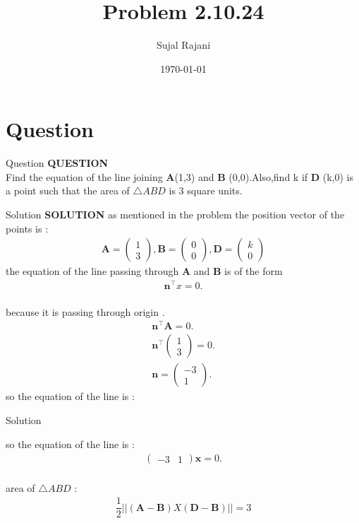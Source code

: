\documentclass{beamer}
\title{Problem 2.10.24}
\author{Sujal Rajani}
\date{\today}
\let\vec\mathbf
\theoremstyle{remark}
\newcommand{\myvec}[1]{\ensuremath{\begin{pmatrix}#1\end{pmatrix}}}
\numberwithin{equation}{section}
\begin{document}
\begin{frame}
\titlepage
\end{frame}

\section{Question}
\begin{frame}{Question}
\textbf{QUESTION}
\\
Find the equation of the line joining $\vec{A}$(1,3) and $\vec{B}$ (0,0).Also,find k if $\vec{D}$ (k,0) is a point such that the area of $\triangle ABD$ is 3 square units.
\end{frame}
\begin{frame}{Solution}
\textbf{SOLUTION}
as mentioned in the problem the position vector of the points is :
\\
\begin{align*}
    \vec{A}=\myvec{1\\3},\vec{B}=\myvec{0\\0},\vec{D}=\myvec{k\\0}
\end{align*}
the equation of the line passing through $\vec{A}$ and $\vec{B}$ is of the form 
\begin{align*}
    \vec{n}^\top x=0 .
\end{align*}
\\ 
because it is passing through origin .
\\
\begin{align*}
      \vec{n}^\top \vec{A}=0.
      \\
      \vec{n}^\top \myvec{1\\3}=0.
            \\
     \vec{n}=\myvec{-3\\1}  .      
\end{align*}
so the equation of the line is :

 \end{frame}
\begin{frame}{Solution}

so the equation of the line is :
\\
\begin{align*}
    \myvec{-3&1} \vec{x}=0 .
\end{align*}
\\
area of $\triangle ABD $ : 
\\
\begin{align*}
    \dfrac{1}{2}||(\vec{A}- \vec{B})X(\vec{D}- \vec{B})||=3
\end{align*}
     \end{frame}
\end{document}
